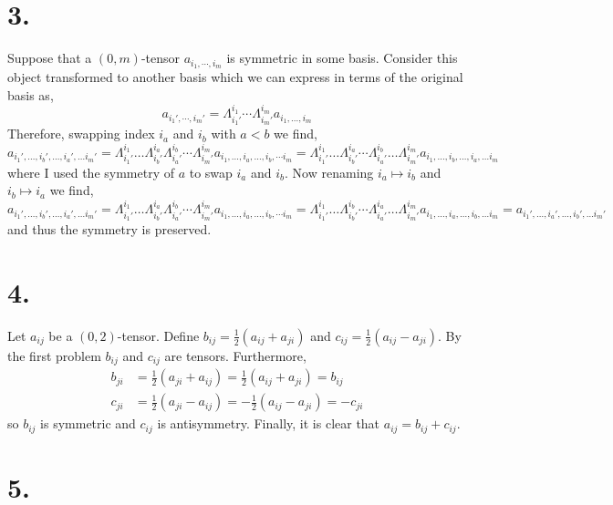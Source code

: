 \documentclass[12pt]{article}
\begin{document}
\section*{3.}

Suppose that a $(0, m)$-tensor $a_{i_1, \cdots, i_m}$ is symmetric in some basis. Consider this object transformed to another basis which we can express in terms of the original basis as,
\[ a_{i_1', \cdots, i_m'} = \Lambda^{i_1}_{i_1'} \cdots \Lambda^{i_m}_{i_m'} a_{i_1, \dots, i_m} \]
Therefore, swapping index $i_a$ and $i_b$ with $a < b$ we find,
\[ a_{i_1', \dots, i_b', \dots, i_a', \dots i_m'} = \Lambda^{i_1}_{i_1'} \dots \Lambda^{i_a}_{i_b'} \Lambda^{i_b}_{i_a'} \cdots \Lambda^{i_m}_{i_m'} a_{i_1, \dots, i_a, \dots, i_b, \cdots i_m} = \Lambda^{i_1}_{i_1'} \dots \Lambda^{i_a}_{i_b'} \cdots \Lambda^{i_b}_{i_a'} \dots \Lambda^{i_m}_{i_m'} a_{i_1, \dots, i_b, \dots, i_a, \dots i_m} \]
where I used the symmetry of $a$ to swap $i_a$ and $i_b$. Now renaming $i_a \mapsto i_b$ and $i_b \mapsto i_a$ we find,
\[ a_{i_1', \dots, i_b', \dots, i_a', \dots i_m'} = \Lambda^{i_1}_{i_1'} \dots \Lambda^{i_a}_{i_b'} \Lambda^{i_b}_{i_a'} \cdots \Lambda^{i_m}_{i_m'} a_{i_1, \dots, i_a, \dots, i_b, \cdots i_m} = \Lambda^{i_1}_{i_1'} \dots \Lambda^{i_b}_{i_b'} \cdots \Lambda^{i_a}_{i_a'} \dots \Lambda^{i_m}_{i_m'} a_{i_1, \dots, i_a, \dots, i_b, \dots i_m} = a_{i_1', \dots, i_a', \dots, i_b', \dots i_m'} \]
and thus the symmetry is preserved. 

\section*{4.}

Let $a_{ij}$ be a $(0,2)$-tensor. Define $b_{ij} = \tfrac{1}{2}(a_{ij} + a_{ji})$ and $c_{ij} = \tfrac{1}{2} (a_{ij} - a_{ji})$. By the first problem $b_{ij}$ and $c_{ij}$ are tensors. Furthermore, 
\begin{align*}
b_{ji} & = \tfrac{1}{2}(a_{ji} + a_{ij}) = \tfrac{1}{2}(a_{ij} + a_{ji}) = b_{ij}
\\
c_{ji} & = \tfrac{1}{2}(a_{ji} - a_{ij}) = - \tfrac{1}{2}(a_{ij} - a_{ji}) = - c_{ji}
\end{align*} 
so $b_{ij}$ is symmetric and $c_{ij}$ is antisymmetry. Finally, it is clear that $a_{ij} = b_{ij} + c_{ij}$. 

\section*{5.} 
\end{document}
